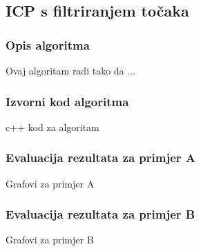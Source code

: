 \subsection{ICP s filtriranjem točaka}

\subsubsection{Opis algoritma}
Ovaj algoritam radi tako da ...

\subsubsection{Izvorni kod algoritma}
c++ kod za algoritam

\subsubsection{Evaluacija rezultata za primjer A}
Grafovi za primjer A

\subsubsection{Evaluacija rezultata za primjer B}
Grafovi za primjer B